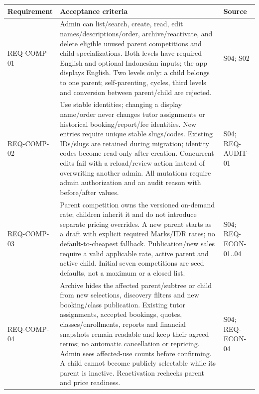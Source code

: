 \documentclass[11pt,a4paper]{article}
\newcounter{none}
\begin{document}
{\def\LTcaptype{none} %
\begin{longtable}[]{@{}
  >{\raggedright\arraybackslash}p{}
  >{\raggedright\arraybackslash}p{}
  >{\raggedright\arraybackslash}p{}@{}}
\toprule\noalign{}
\begin{minipage}[b]{\linewidth}\raggedright
Requirement
\end{minipage} & \begin{minipage}[b]{\linewidth}\raggedright
Acceptance criteria
\end{minipage} & \begin{minipage}[b]{\linewidth}\raggedright
Source
\end{minipage} \\
\midrule\noalign{}
\endhead
\bottomrule\noalign{}
\endlastfoot
REQ-COMP-01 & Admin can list/search, create, read, edit names/descriptions/order, archive/reactivate, and delete eligible unused parent competitions and child specializations. Both levels have required English and optional Indonesian inputs; the app displays English. Two levels only: a child belongs to one parent; self-parenting, cycles, third levels and conversion between parent/child are rejected. & S04; S02 \\
REQ-COMP-02 & Use stable identities; changing a display name/order never changes tutor assignments or historical booking/report/fee identities. New entries require unique stable slugs/codes. Existing IDs/slugs are retained during migration; identity codes become read-only after creation. Concurrent edits fail with a reload/review action instead of overwriting another admin. All mutations require admin authorization and an audit reason with before/after values. & S04; REQ-AUDIT-01 \\
REQ-COMP-03 & Parent competition owns the versioned on-demand rate; children inherit it and do not introduce separate pricing overrides. A new parent starts as a draft with explicit required Marks/IDR rates; no default-to-cheapest fallback. Publication/new sales require a valid applicable rate, active parent and active child. Initial seven competitions are seed defaults, not a maximum or a closed list. & S04; REQ-ECON-01..04 \\
REQ-COMP-04 & Archive hides the affected parent/subtree or child from new selections, discovery filters and new booking/class publication. Existing tutor assignments, accepted bookings, quotes, classes/enrollments, reports and financial snapshots remain readable and keep their agreed terms; no automatic cancellation or repricing. Admin sees affected-use counts before confirming. A child cannot become publicly selectable while its parent is inactive. Reactivation rechecks parent and price readiness. & S04; REQ-ECON-04 \\

\end{longtable}}
\end{document}
